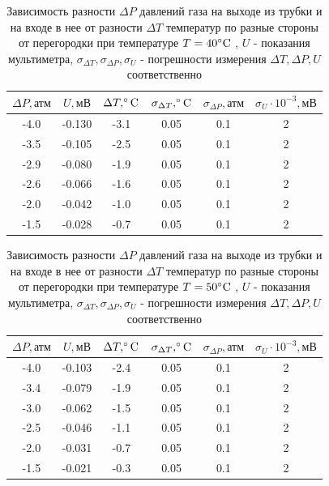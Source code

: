 \begin{table}[h]
    \centering
    \begin{tabular}{|c|c|c|c|c|c|}
    \hline
    $\Delta P, \text{атм}$ & $U, \text{мВ}$ & $\Delta T, \celsius$  & $\sigma_{\Delta T}, \celsius$  & $\sigma_{\Delta P}, \text{атм}$ & $\sigma_U\cdot 10^{-3}, \text{мВ}$ \\ \hline
     -4.0  & -0.130  & -3.1   & 0.05   & 0.1   & 2 \\ \hline
     -3.5  & -0.105  & -2.5   & 0.05   & 0.1   & 2 \\ \hline
     -2.9  & -0.080  & -1.9   & 0.05   & 0.1   & 2 \\ \hline
     -2.6  & -0.066  & -1.6   & 0.05   & 0.1   & 2 \\ \hline
     -2.0  & -0.042  & -1.0   & 0.05   & 0.1   & 2 \\ \hline
     -1.5  & -0.028  & -0.7   & 0.05   & 0.1   & 2 \\ \hline
\end{tabular}
    \caption{Зависимость разности $\Delta P$ давлений газа на выходе из трубки и на входе в нее от разности $\Delta T$ температур по разные стороны от перегородки при температуре $T = 40\celsius$ , $U$ - показания мультиметра, $\sigma_{\Delta T}, \sigma_{\Delta P}, \sigma_U$ - погрешности измерения $\Delta T, \Delta P, U$ соответственно}
    \label{tab:t1}
\end{table}

\begin{table}[h]
    \centering
    \begin{tabular}{|c|c|c|c|c|c|}
    \hline
    $\Delta P, \text{атм}$ & $U, \text{мВ}$ & $\Delta T, \celsius$  & $\sigma_{\Delta T}, \celsius$  & $\sigma_{\Delta P}, \text{атм}$ & $\sigma_U\cdot 10^{-3}, \text{мВ}$ \\ \hline
     -4.0  & -0.103  & -2.4   & 0.05   & 0.1   & 2 \\ \hline
     -3.4  & -0.079  & -1.9   & 0.05   & 0.1   & 2 \\ \hline
     -3.0  & -0.062  & -1.5   & 0.05   & 0.1   & 2 \\ \hline
     -2.5  & -0.046  & -1.1   & 0.05   & 0.1   & 2 \\ \hline
     -2.0  & -0.031  & -0.7   & 0.05   & 0.1   & 2 \\ \hline
     -1.5  & -0.021  & -0.3   & 0.05   & 0.1   & 2 \\ \hline
\end{tabular}
    \caption{Зависимость разности $\Delta P$ давлений газа на выходе из трубки и на входе в нее от разности $\Delta T$ температур по разные стороны от перегородки при температуре $T = 50\celsius$ , $U$ - показания мультиметра, $\sigma_{\Delta T}, \sigma_{\Delta P}, \sigma_U$ - погрешности измерения $\Delta T, \Delta P, U$ соответственно}
    \label{tab:t1}
\end{table}
\newpage
